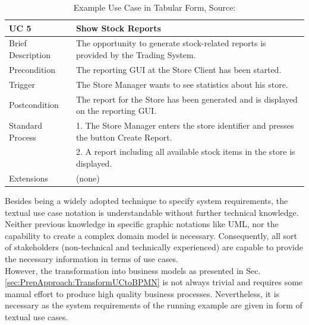 \begin{table}[!h]
	\centering
	\begin{tabularx}{\textwidth}{|l||X|}
		\hline
		UC 5 & Show Stock Reports \\ 
		\hline
		Brief Description &  The opportunity to generate stock-related reports is provided
		by the Trading System. \\
		\hline
		Precondition & The reporting GUI at the Store Client has been started. \\
		\hline
		Trigger & The Store Manager wants to see statistics about his store. \\
		\hline
		Postcondition & The report for the Store has been generated and is displayed on
		the reporting GUI. \\
		\hline 
		Standard Process &
		
		1. The Store Manager enters the store identifier and presses the button Create
		Report.  \\
		& 2. A report including all available stock items in the store is displayed. \\  
		\hline
		Extensions & (none) \\ \hline
		
		
	\end{tabularx}
	\caption{Example Use Case in Tabular Form, Source: \cite{CoCoMEOld}}
	\label{tab:exampleUseCase}
	
\end{table}

\noindent
Besides being a widely adopted technique to specify system requirements, the textual use case notation is understandable without further technical knowledge. Neither previous knowledge in specific graphic notations like UML, nor the capability to create a complex domain model is necessary. Consequently, all sort of stakeholders (non-technical and technically experienced) are capable to provide the necessary information in terms of use cases. \\
However, the transformation into business models as presented in Sec.\ref{sec:PrepApproach:TransformUCtoBPMN} is not always trivial and requires some manual effort to produce high quality business processes. Nevertheless, it is necessary as the system requirements of the running example are given in form of textual use cases.





